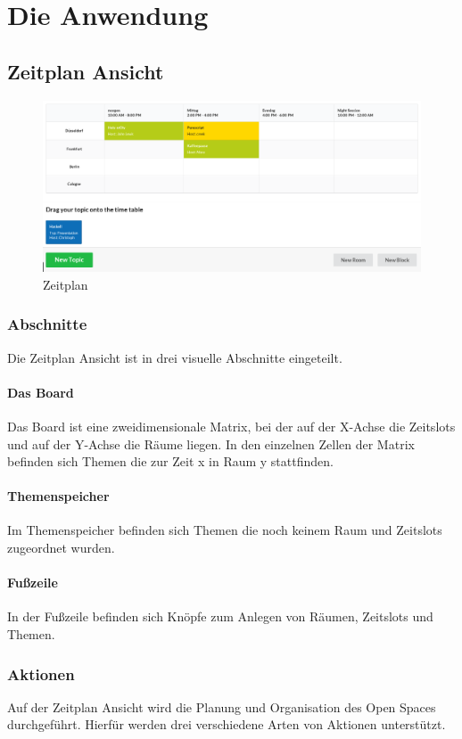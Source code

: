 \chapter{Die Anwendung}
\section{Zeitplan Ansicht}

\begin{figure}[ht]
  \centering
  \includegraphics[width=\textwidth]{fig/timetable.png}
  \caption{Zeitplan}
\end{figure}

\subsection{Abschnitte}
Die Zeitplan Ansicht ist in drei visuelle Abschnitte eingeteilt.
\subsubsection*{Das Board}
Das Board ist eine zweidimensionale Matrix, bei der auf der X-Achse die
Zeitslots und auf der Y-Achse die Räume liegen. In den einzelnen Zellen der
Matrix befinden sich Themen die zur Zeit x in Raum y stattfinden.
\subsubsection*{Themenspeicher}
Im Themenspeicher befinden sich Themen die noch keinem Raum und Zeitslots
zugeordnet wurden.
\subsubsection*{Fußzeile}
In der Fußzeile befinden sich Knöpfe zum Anlegen von Räumen, Zeitslots und
Themen.
\subsection{Aktionen}
Auf der Zeitplan Ansicht wird die Planung und Organisation des Open Spaces
durchgeführt. Hierfür werden drei verschiedene Arten von Aktionen unterstützt.
